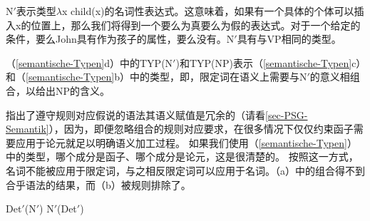 N$'$表示类型$\lambda$x child(x)的名词性表达式。这意味着，如果有一个具体的个体可以插入x的位置上，那么我们将得到一个要么为真要么为假的表达式。对于一个给定的条件，要么John具有作为孩子的属性，要么没有。N$'$具有与VP相同的类型。

（\ref{semantische-Typen}d）中的TYP(N$'$)和TYP(NP)表示（\ref{semantische-Typen}c）和（\ref{semantische-Typen}b）中的类型，即，限定词在语义上需要与N$'$的意义相组合，以给出NP的含义。

 \citet*[]{GKPS85a}指出了遵守规则对应假说的语法其语义赋值是冗余的（请看\ref{sec-PSG-Semantik}），因为，即便忽略组合的规则对应要求，在很多情况下仅仅约束函子需要应用于论元就足以明确语义加工过程。
如果我们使用（\ref{semantische-Typen}）中的类型，哪个成分是函子、哪个成分是论元，这是很清楚的。
按照这一方式，名词不能被应用于限定词，与之相反限定词可以应用于名词。（a）中的组合得不到合乎语法的结果，而（b）被规则排除了。

\begin{samepage}
\eal
\ex Det$'$(N$'$)
\ex N$'$(Det$'$)
\zl
\end{samepage}

